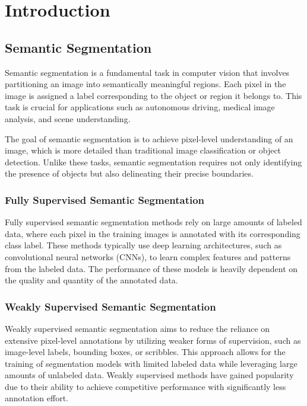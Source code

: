 \chapter{Introduction}
\label{chap:introduction}

\section{Semantic Segmentation}
\label{sec:semantic_segmentation}
Semantic segmentation is a fundamental task in computer vision that involves partitioning an image into semantically meaningful regions. Each pixel in the image is assigned a label corresponding to the object or region it belongs to. This task is crucial for applications such as autonomous driving, medical image analysis, and scene understanding.

The goal of semantic segmentation is to achieve pixel-level understanding of an image, which is more detailed than traditional image classification or object detection. Unlike these tasks, semantic segmentation requires not only identifying the presence of objects but also delineating their precise boundaries.


\subsection{Fully Supervised Semantic Segmentation}
\label{subsec:fully_supervised}
Fully supervised semantic segmentation methods rely on large amounts of labeled data, where each pixel in the training images is annotated with its corresponding class label. These methods typically use deep learning architectures, such as convolutional neural networks (CNNs), to learn complex features and patterns from the labeled data. The performance of these models is heavily dependent on the quality and quantity of the annotated data.

\subsection{Weakly Supervised Semantic Segmentation}
\label{subsec:weakly_supervised}
Weakly supervised semantic segmentation aims to reduce the reliance on extensive pixel-level annotations by utilizing weaker forms of supervision, such as image-level labels, bounding boxes, or scribbles. This approach allows for the training of segmentation models with limited labeled data while leveraging large amounts of unlabeled data. Weakly supervised methods have gained popularity due to their ability to achieve competitive performance with significantly less annotation effort.

